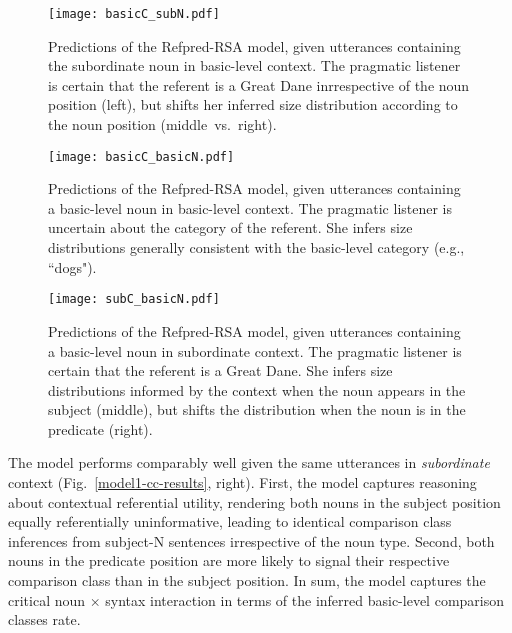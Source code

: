 \begin{figure*}[t]
	\begin{center}
		\texttt{[image: basicC\_subN.pdf]}%
	\end{center}
	\vspace{-0.3cm}
	\caption{Predictions of the Refpred-RSA model, given utterances containing the subordinate noun in basic-level context. The pragmatic listener is certain that the referent is a Great Dane inrrespective of the noun position (left), but shifts her inferred size distribution according to the noun position (middle~vs.~right).}
	\label{model1-ref-size-results}
\end{figure*}
\begin{figure*}[h]
	\begin{center}
		\texttt{[image: basicC\_basicN.pdf]}%
	\end{center}
	\vspace{-0.3cm}
	\caption{Predictions of the Refpred-RSA model, given utterances containing a basic-level noun in basic-level context. The pragmatic listener is uncertain about the category of the referent. She infers size distributions generally consistent with the basic-level category (e.g., ``dogs").}
	\label{model1-basicN-basicC}
\end{figure*}
\begin{figure*}[b]
	\begin{center}
		\texttt{[image: subC\_basicN.pdf]}%
	\end{center}
	\vspace{-0.3cm}
	\caption{Predictions of the Refpred-RSA model, given utterances containing a basic-level noun in subordinate context. The pragmatic listener is certain that the referent is a Great Dane. She infers size distributions informed by the context when the noun appears in the subject (middle), but shifts the distribution when the noun is in the predicate (right).}
	\label{model1-basicN-subC}
\end{figure*}
The model performs comparably well given the same utterances in \emph{subordinate} context (Fig.~\ref{model1-cc-results}, right). %
First, the model captures reasoning about contextual referential utility, rendering both nouns in the subject position equally referentially uninformative, leading to identical comparison class inferences from subject-N sentences irrespective of the noun type. Second, both nouns in the predicate position are more likely to signal their respective comparison class than in the subject position. In sum, the model captures the critical noun $\times$ syntax interaction in terms of the inferred basic-level comparison classes rate.

